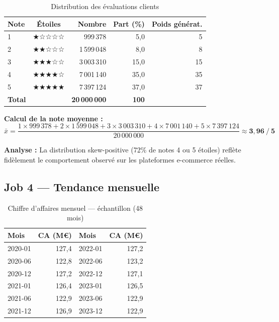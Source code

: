 \documentclass[12pt,a4paper]{article}
\begin{document}
\begin{table}[H]
  \centering
  \caption{Distribution des évaluations clients}
  \label{tab:ratings}
  \begin{tabular}{lcrrr}
    \toprule
    \textbf{Note} & \textbf{Étoiles} & \textbf{Nombre} & \textbf{Part (\%)} & \textbf{Poids générat.} \\
    \midrule
    1 & ★☆☆☆☆ & 999\,378    & 5,0  & 5  \\
    2 & ★★☆☆☆ & 1\,599\,048 & 8,0  & 8  \\
    3 & ★★★☆☆ & 3\,003\,310 & 15,0 & 15 \\
    4 & ★★★★☆ & 7\,001\,140 & 35,0 & 35 \\
    5 & ★★★★★ & 7\,397\,124 & 37,0 & 37 \\
    \midrule
    \textbf{Total} & & \textbf{20\,000\,000} & \textbf{100} & \\
    \bottomrule
  \end{tabular}
\end{table}

\textbf{Calcul de la note moyenne :}
\[
\bar{x} = \frac{1 \times 999\,378 + 2 \times 1\,599\,048 + 3 \times 3\,003\,310
               + 4 \times 7\,001\,140 + 5 \times 7\,397\,124}{20\,000\,000}
        \approx \mathbf{3{,}96\ / \ 5}
\]

\textbf{Analyse :} La distribution skew-positive (72\% de notes 4 ou 5 étoiles)
reflète fidèlement le comportement observé sur les plateformes e-commerce réelles.

\subsection{Job 4 — Tendance mensuelle}

\begin{table}[H]
  \centering
  \caption{Chiffre d'affaires mensuel — échantillon (48 mois)}
  \label{tab:monthly}
  \begin{tabular}{lrlr}
    \toprule
    \textbf{Mois} & \textbf{CA (M€)} & \textbf{Mois} & \textbf{CA (M€)} \\
    \midrule
    2020-01 & 127,4 & 2022-01 & 127,2 \\
    2020-06 & 122,8 & 2022-06 & 123,2 \\
    2020-12 & 127,2 & 2022-12 & 127,1 \\
    2021-01 & 126,4 & 2023-01 & 126,5 \\
    2021-06 & 122,9 & 2023-06 & 122,9 \\
    2021-12 & 126,9 & 2023-12 & 122,9 \\
    \bottomrule
  \end{tabular}
\end{table}
\end{document}
